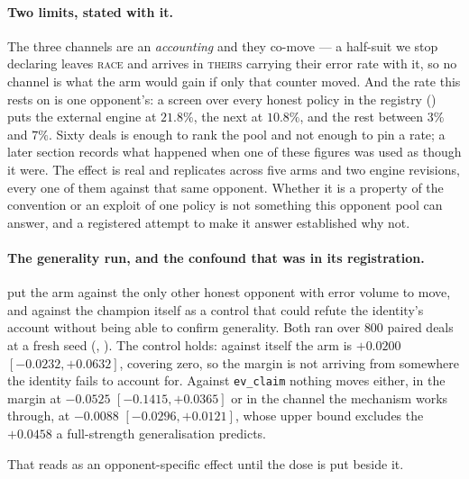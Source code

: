 \documentclass[11pt,letterpaper]{article}
\begin{document}
\paragraph{Two limits, stated with it.} The three channels are an
\emph{accounting} and they co-move --- a half-suit we stop declaring leaves
\textsc{race} and arrives in \textsc{theirs} carrying their error rate with it,
so no channel is what the arm would gain if only that counter moved. And
the rate this rests on is one opponent's: a screen over every honest policy in
the registry () puts the external engine
at $21.8\%$, the next at $10.8\%$, and the rest between $3\%$ and $7\%$. Sixty
deals is enough to rank the pool and not enough to pin a rate; a later section
records what happened when one of these figures was used as though it were.
The
effect is real and replicates across five arms and two engine revisions, every
one of them against that same opponent. Whether
it is a property of the convention or an exploit of one policy is not something
this opponent pool can answer, and a registered attempt to make it answer
established why not.

\paragraph{The generality run, and the confound that was in its registration.}
 put the arm against the only other honest
opponent with error volume to move, and against the champion itself as a
control that could refute the identity's account without being able to confirm
generality. Both ran over $800$ paired deals at a fresh seed
(,
). The control holds: against
itself the arm is $+0.0200$ $[-0.0232, +0.0632]$, covering zero, so the margin
is not arriving from somewhere the identity fails to account for. Against
\texttt{ev\_claim} nothing moves either, in the margin at $-0.0525$ $[-0.1415,
+0.0365]$ or in the channel the mechanism works through, at $-0.0088$ $[-0.0296,
+0.0121]$, whose upper bound excludes the $+0.0458$ a full-strength
generalisation predicts.

That reads as an opponent-specific effect until the dose is put beside it.
\end{document}
